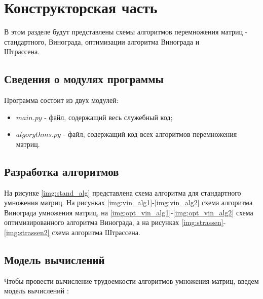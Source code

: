 \chapter{Конструкторская часть}
В этом разделе будут представлены схемы алгоритмов перемножения матриц - стандартного, Винограда, оптимизации алгоритма Винограда и \\Штрассена.

\section{Сведения о модулях программы}
Программа состоит из двух модулей:
\begin{itemize}
	\item $main.py$ - файл, содержащий весь служебный код;
    \item $algorythms.py$ - файл, содержащий код всех алгоритмов перемножения матриц. \newline
\end{itemize}


\section{Разработка алгоритмов}
На рисунке \ref{img:stand_alg} представлена схема алгоритма для стандартного умножения матриц. На рисунках \ref{img:vin_alg1}-\ref{img:vin_alg2} схема алгоритма Винограда умножения матриц, на \ref{img:opt_vin_alg1}-\ref{img:opt_vin_alg2} схема оптимизированного алгоритма Винограда, а на рисунках \ref{img:strassen}-\ref{img:strassen2} схема алгоритма Штрассена. 


\clearpage


\section{Модель вычислений}

Чтобы провести вычисление трудоемкости алгоритмов умножения матриц, введем модель вычислений \cite{model}:

